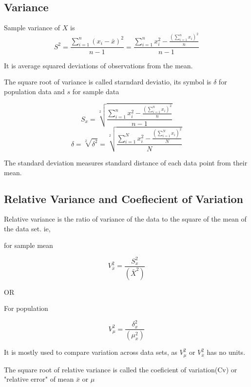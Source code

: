\documentclass[12pt]{article}
\begin{document}
\subsection{Variance}
Sample variance of $X$ is
\begin{equation}
    S^2 = \frac{\sum_{i = 1}^{n}(x_i - \bar{x})^2}{n - 1} = \frac{\sum_{i = 1}^{n} x_i^2 - \frac{(\sum_{i = 1}^{n}x_i)^2}{n}}{n-1}
\end{equation}

It is average squared deviations of observations from the mean.

The square root of variance is called starndard deviatio, its symbol is $\delta$ for population data and $s$ for sample data

\begin{equation}
    S_x = \sqrt[2]{\frac{\sum_{i = 1}^{n} x_i^2 - \frac{(\sum_{i = 1}^{n}x_i)^2}{n}}{n-1}}
\end{equation}
\begin{equation}
    \delta = \sqrt[2]{\delta^2} = \sqrt[2]{\frac{\sum_{i = 1}^{N} x_i^2 - \frac{(\sum_{i = 1}^{N}x_i)^2}{N}}{N}}
\end{equation}

The standard deviation measures standard distance of each data point from their mean.
\subsection{Relative Variance and Coefiecient of Variation}

Relative variance is the ratio of variance of the data to the square of the mean of the data set. ie,
\begin{center}
    for sample mean
\end{center}
\begin{equation}
    V_{\bar{x}}^2 = \frac{S_x^2}{(\bar{X}^2)}
\end{equation}
\begin{center}
    OR
\end{center}
\begin{center}
    For population
\end{center}
\begin{equation}
    V_{\mu}^2 = \frac{\delta_x^2}{(\mu_x^2)}
\end{equation}

It is mostly used to compare variation across data sets, as $V_{\mu}^2$ or $V_{\bar{x}}^2$ has no units.

The square root of relative variance is called the coeficient of variation(Cv) or "relative error" of mean $\bar{x}$ or $\mu$
\end{document}
